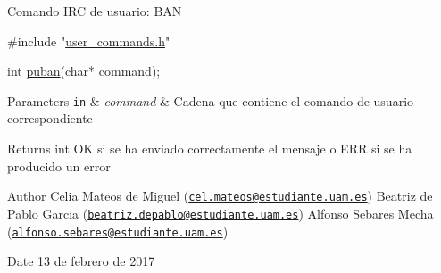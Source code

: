 Comando I\-R\-C de usuario\-: B\-A\-N


\begin{DoxyCode}
\textcolor{preprocessor}{#include "\hyperlink{user__commands_8h}{user\_commands.h}"}

\textcolor{keywordtype}{int} \hyperlink{user__commands_8h_a8b10f809b49ed8686a693efc87f144e5}{puban}(\textcolor{keywordtype}{char}* command);
\end{DoxyCode}



\begin{DoxyParams}[1]{Parameters}
\mbox{\tt in}  & {\em command} & Cadena que contiene el comando de usuario correspondiente\\
\hline
\end{DoxyParams}
\begin{DoxyReturn}{Returns}
int O\-K si se ha enviado correctamente el mensaje o E\-R\-R si se ha producido un error
\end{DoxyReturn}
\begin{DoxyAuthor}{Author}
Celia Mateos de Miguel (\href{mailto:cel.mateos@estudiante.uam.es}{\tt cel.\-mateos@estudiante.\-uam.\-es}) Beatriz de Pablo Garcia (\href{mailto:beatriz.depablo@estudiante.uam.es}{\tt beatriz.\-depablo@estudiante.\-uam.\-es}) Alfonso Sebares Mecha (\href{mailto:alfonso.sebares@estudiante.uam.es}{\tt alfonso.\-sebares@estudiante.\-uam.\-es})
\end{DoxyAuthor}
\begin{DoxyDate}{Date}
13 de febrero de 2017
\end{DoxyDate}


 